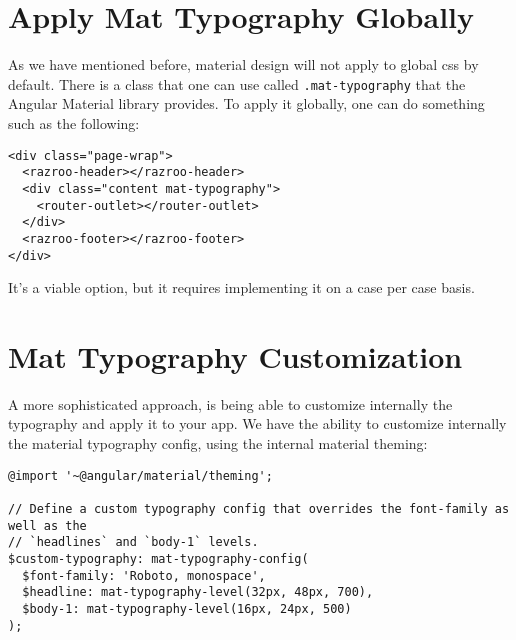 \section{Apply Mat Typography Globally}
As we have mentioned before, material design will not apply to global css by 
default. There is a class that one can use called \lstinline{.mat-typography}
that the Angular Material library provides. To apply it globally, one can do 
something such as the following: 
\begin{lstlisting}[caption=app.component.html]
<div class="page-wrap">
  <razroo-header></razroo-header>
  <div class="content mat-typography">
    <router-outlet></router-outlet>
  </div>
  <razroo-footer></razroo-footer>
</div>
\end{lstlisting}

It's a viable option, but it requires implementing it on a case per case basis.

\section{Mat Typography Customization}
A more 
sophisticated approach, is being able to customize internally the typography 
and apply it to your app. We have the ability to customize internally the 
material typography config, using the internal material theming: 

\begin{lstlisting}
@import '~@angular/material/theming';

// Define a custom typography config that overrides the font-family as well as the
// `headlines` and `body-1` levels.
$custom-typography: mat-typography-config(
  $font-family: 'Roboto, monospace',
  $headline: mat-typography-level(32px, 48px, 700),
  $body-1: mat-typography-level(16px, 24px, 500)
);
\end{lstlisting}


